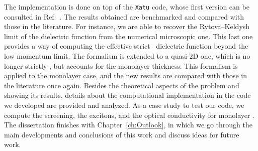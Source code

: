 The implementation is done on top of the \texttt{Xatu} code, whose first version can be consulted in Ref.~\cite{Xatu}.
The results obtained are benchmarked and compared with those in the literature.
For instance, we are able to recover the Rytova--Keldysh limit of the dielectric function from the numerical microscopic one.
This last one provides a way of computing the effective strict \bd~dielectric function beyond the low momentum limit.
The formalism is extended to a quasi-2D one, which is no longer strictly \bd, but accounts for the monolayer thickness.
This formalism is applied to the monolayer case, and the new results are compared with those in the literature once again.
Besides the theoretical aspects of the problem and showing its results, details about the computational implementation in the code we developed are provided and analyzed.
As a case study to test our code, we compute the screening, the excitons, and the optical conductivity for monolayer .
The dissertation finishes with Chapter~\ref{ch:Outlook}, in which we go through the main developments and conclusions of this work and discuss ideas for future work.

